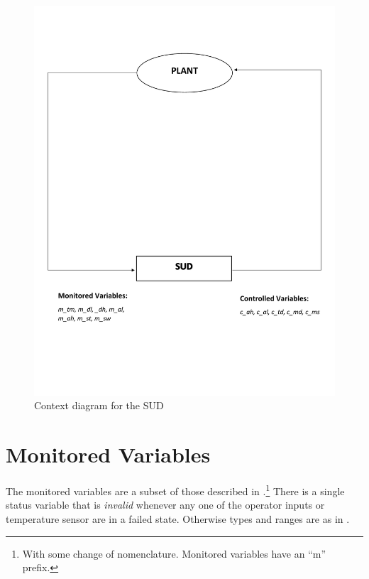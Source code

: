 \documentclass[fontsize=12pt,paper=letter,twoside]{scrartcl}
\begin{document}
\begin{figure}[!htb]
\begin{center}
\includegraphics[width=.8\textwidth]{images/context-diagram.pdf}
\end{center}
\caption{Context diagram for the SUD}
\label{fig:context}
\end{figure}



\newpage
\section{Monitored Variables}

The monitored variables are a subset of those described in \cite{REMH}.\footnote{With some change of nomenclature. Monitored variables have an ``m'' prefix.} There is a single status variable  that is \emph{invalid} whenever any one of the operator inputs or temperature sensor are in a failed state. Otherwise types and ranges are as in \cite{REMH}.
\end{document}
